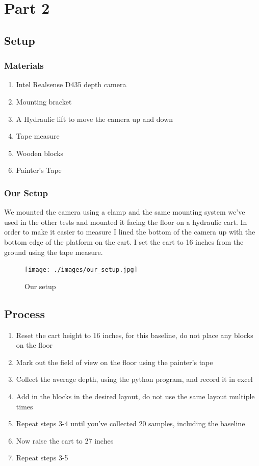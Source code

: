 \documentclass{article}
\begin{document}
			
	\section{Part 2}
		\subsection{Setup}
		
			\subsubsection{Materials}
			
			\begin{enumerate}
				\item Intel Realsense D435 depth camera
				\item Mounting bracket
				\item A Hydraulic lift to move the camera up and down
				\item Tape measure
				\item Wooden blocks
				\item Painter's Tape
			\end{enumerate}
		
			\newpage
			\subsubsection{Our Setup}
			We mounted the camera using a clamp and the same mounting system we've used in the other tests and mounted it facing the floor on a hydraulic cart. In order to make it easier to measure I lined the bottom of the camera up with the bottom edge of the platform on the cart. I set the cart to 16 inches from the ground using the tape measure.
			
			
			
			\begin{figure}[h]
				\texttt{[image: ./images/our\_setup.jpg]}
				\centering
				\caption{Our setup}
				\label{fig:p2_setup}
			\end{figure}
		
		
		\newpage
		\subsection{Process}
			\begin{enumerate}
				\item Reset the cart height to 16 inches, for this baseline, do not place any blocks on the floor
				\item Mark out the field of view on the floor using the painter's tape
				\item Collect the average depth, using the python program, and record it in excel
				\item Add in the blocks in the desired layout, do not use the same layout multiple times
				\item Repeat steps 3-4 until you've collected 20 samples, including the baseline
				\item Now raise the cart to 27 inches
				\item Repeat steps 3-5
			\end{enumerate}
		
\end{document}
